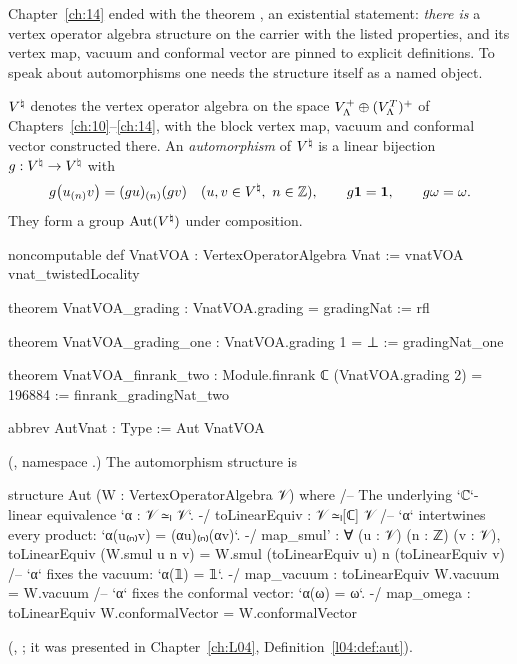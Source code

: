 Chapter~\ref{ch:14} ended with the theorem , an existential statement: \emph{there is} a
vertex operator algebra structure on the carrier  with the listed properties, and its vertex map, vacuum and
conformal vector are pinned to explicit definitions.  To speak about automorphisms one needs the structure itself as a
named object.

\begin{definition}\label{ch16:def:vnatvoa}
${V^{\natural}}$ denotes the vertex operator algebra on the space $V_{\Lambda}^+\oplus(V_{\Lambda}^T)^+$ of
Chapters~\ref{ch:10}--\ref{ch:14}, with the block vertex map, vacuum and conformal vector constructed there.  An
\emph{automorphism} of ${V^{\natural}}$ is a linear bijection $g:{V^{\natural}}\to{V^{\natural}}$ with
\begin{equation*}
  g\bigl(u_{(n)}v\bigr)=(gu)_{(n)}(gv)\quad(u,v\in\Vnat,\ n\in\Z),\qquad g\mathbf 1=\mathbf 1,\qquad g\omega=\omega .
\end{equation*}
They form a group $\operatorname{Aut}({V^{\natural}})$ under composition.
\end{definition}
\begin{leancode}
noncomputable def VnatVOA : VertexOperatorAlgebra Vnat := vnatVOA vnat_twistedLocality

theorem VnatVOA_grading : VnatVOA.grading = gradingNat := rfl

theorem VnatVOA_grading_one : VnatVOA.grading 1 = ⊥ := gradingNat_one

theorem VnatVOA_finrank_two : Module.finrank ℂ (VnatVOA.grading 2) = 196884 :=
  finrank_gradingNat_two

abbrev AutVnat : Type := Aut VnatVOA
\end{leancode}
(, namespace .)  The automorphism structure is
\begin{leancode}
structure Aut (W : VertexOperatorAlgebra 𝒱) where
  /-- The underlying `ℂ`-linear equivalence `α : 𝒱 ≃ₗ 𝒱`. -/
  toLinearEquiv : 𝒱 ≃ₗ[ℂ] 𝒱
  /-- `α` intertwines every product: `α(u₍ₙ₎v) = (αu)₍ₙ₎(αv)`. -/
  map_smul' : ∀ (u : 𝒱) (n : ℤ) (v : 𝒱),
    toLinearEquiv (W.smul u n v) = W.smul (toLinearEquiv u) n (toLinearEquiv v)
  /-- `α` fixes the vacuum: `α(𝟙) = 𝟙`. -/
  map_vacuum : toLinearEquiv W.vacuum = W.vacuum
  /-- `α` fixes the conformal vector: `α(ω) = ω`. -/
  map_omega : toLinearEquiv W.conformalVector = W.conformalVector
\end{leancode}
(, ; it was presented in Chapter~\ref{ch:L04},
Definition~\ref{l04:def:aut}).

